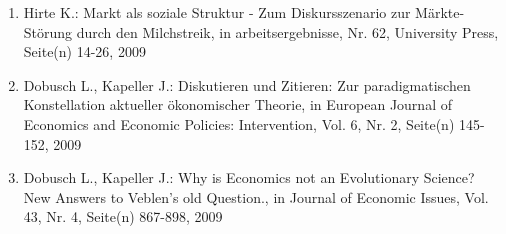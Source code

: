 \begin{enumerate}
	 \item Hirte K.: Markt als soziale Struktur - Zum Diskursszenario zur \glqq Märkte-Störung\grqq{} durch den Milchstreik, in arbeitsergebnisse, Nr. 62, University Press, Seite(n) 14-26, 2009
	 \item Dobusch L., Kapeller J.: Diskutieren und Zitieren: Zur paradigmatischen Konstellation aktueller ökonomischer Theorie, in European Journal of Economics and Economic Policies: Intervention, Vol. 6, Nr. 2, Seite(n) 145-152, 2009
	 \item Dobusch L., Kapeller J.: Why is Economics not an Evolutionary Science? New Answers to Veblen's old Question., in Journal of Economic Issues, Vol. 43, Nr. 4, Seite(n) 867-898, 2009
\end{enumerate}
